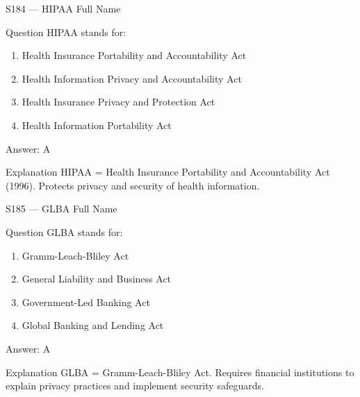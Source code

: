 \documentclass[aspectratio=169,8pt]{beamer}
\begin{document}
\begin{frame}{S184 --- HIPAA Full Name}
	\begin{block}{Question}
		HIPAA stands for:
		\begin{enumerate}
			\item Health Insurance Portability and Accountability Act
			\item Health Information Privacy and Accountability Act
			\item Health Insurance Privacy and Protection Act
			\item Health Information Portability Act
		\end{enumerate}
	\end{block}
	\begin{exampleblock}{Answer: A}\end{exampleblock}
	\begin{block}{Explanation}
		HIPAA = Health Insurance Portability and Accountability Act (1996). Protects privacy and security of health information.
	\end{block}
\end{frame}

\begin{frame}{S185 --- GLBA Full Name}
	\begin{block}{Question}
		GLBA stands for:
		\begin{enumerate}
			\item Gramm-Leach-Bliley Act
			\item General Liability and Business Act
			\item Government-Led Banking Act
			\item Global Banking and Lending Act
		\end{enumerate}
	\end{block}
	\begin{exampleblock}{Answer: A}\end{exampleblock}
	\begin{block}{Explanation}
		GLBA = Gramm-Leach-Bliley Act. Requires financial institutions to explain privacy practices and implement security safeguards.
	\end{block}
\end{frame}
\end{document}
